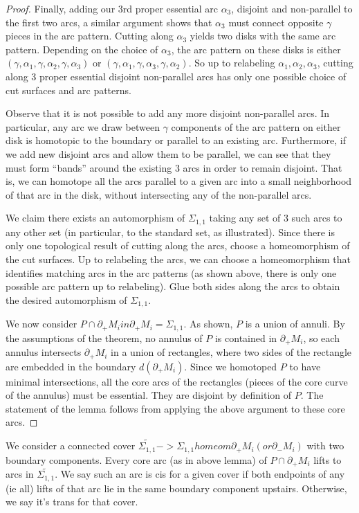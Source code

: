 \documentclass[12pt]{amsart}
\theoremstyle{definition}
\newcommand{\bd}{\partial}
\newcommand{\Si}{\Sigma}
\begin{document}
\begin{proof}
Finally, adding our 3rd proper essential arc $\alpha_3$, disjoint and
non-parallel to the first two arcs, a similar argument shows that $\alpha_3$
must connect opposite $\gamma$ pieces in the arc pattern. Cutting along
$\alpha_3$ yields two disks with the same arc pattern. Depending on the choice
of $\alpha_3$, the arc pattern on these disks is either
$(\gamma,\alpha_1,\gamma,\alpha_2,\gamma,\alpha_3)$ or
$(\gamma,\alpha_1,\gamma,\alpha_3,\gamma,\alpha_2)$. So up to relabeling
$\alpha_1,\alpha_2,\alpha_3$, cutting along 3 proper essential disjoint
non-parallel arcs has only one possible choice of cut surfaces and arc
patterns.

Observe that it is not possible to add any more disjoint non-parallel arcs. In
particular, any arc we draw between $\gamma$ components of the arc pattern on
either disk is homotopic to the boundary or parallel to an existing arc.
Furthermore, if we add new disjoint arcs and allow them to be parallel, we can
see that they must form ``bands'' around the existing 3 arcs in order to remain
disjoint. That is, we can homotope all the arcs parallel to a given arc into
a small neighborhood of that arc in the disk, without intersecting any of the
non-parallel arcs.

We claim there exists an automorphism of $\Si_{1,1}$ taking any set of 3 such
arcs to any other set (in particular, to the standard set, as illustrated).
Since there is only one topological result of cutting along the arcs, choose
a homeomorphism of the cut surfaces. Up to relabeling the arcs, we can choose
a homeomorphism that identifies matching arcs in the arc patterns (as shown
above, there is only one possible arc pattern up to relabeling). Glue both
sides along the arcs to obtain the desired automorphism of $\Si_{1,1}$.

We now consider $P \cap \bd_+M_i in \bd_+M_i = \Si_{1,1}$. As shown, $P$ is
a union of annuli. By the assumptions of the theorem, no annulus of $P$ is
contained in $\bd_+M_i$, so each annulus intersects $\bd_+M_i$ in a union of
rectangles, where two sides of the rectangle are embedded in the boundary
$d(\bd_+M_i)$. Since we homotoped $P$ to have minimal intersections, all the
core arcs of the rectangles (pieces of the core curve of the annulus) must be
essential. They are disjoint by definition of $P$. The statement of the lemma
follows from applying the above argument to these core arcs.

\end{proof}

We consider a connected cover $\widetilde{\Si_{1,1}} -> \Si_{1,1} homeom
\bd_+M_i (or \bd_-M_i)$ with two boundary components. Every core arc (as in
above lemma) of $P \cap \bd_+M_i$ lifts to arcs in $\widetilde{\Si_{1,1}}$. We
say such an arc is cis for a given cover if both endpoints of any (ie all)
lifts of that arc lie in the same boundary component upstairs. Otherwise, we
say it's trans for that cover.
\end{document}
